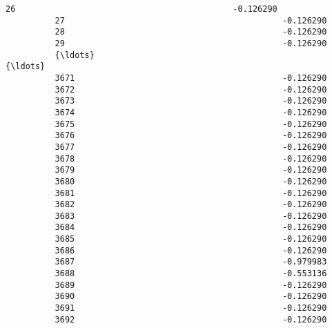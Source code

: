 \documentclass[11pt]{article}
\begin{document}
\begin{Verbatim}[commandchars=\\\{\}]
          26                                            -0.126290                               
          27                                            -0.126290                               
          28                                            -0.126290                               
          29                                            -0.126290                               
          {\ldots}                                                 {\ldots}                               
          3671                                          -0.126290                               
          3672                                          -0.126290                               
          3673                                          -0.126290                               
          3674                                          -0.126290                               
          3675                                          -0.126290                               
          3676                                          -0.126290                               
          3677                                          -0.126290                               
          3678                                          -0.126290                               
          3679                                          -0.126290                               
          3680                                          -0.126290                               
          3681                                          -0.126290                               
          3682                                          -0.126290                               
          3683                                          -0.126290                               
          3684                                          -0.126290                               
          3685                                          -0.126290                               
          3686                                          -0.126290                               
          3687                                          -0.979983                               
          3688                                          -0.553136                               
          3689                                          -0.126290                               
          3690                                          -0.126290                               
          3691                                          -0.126290                               
          3692                                          -0.126290                               

\end{Verbatim}
\end{document}
